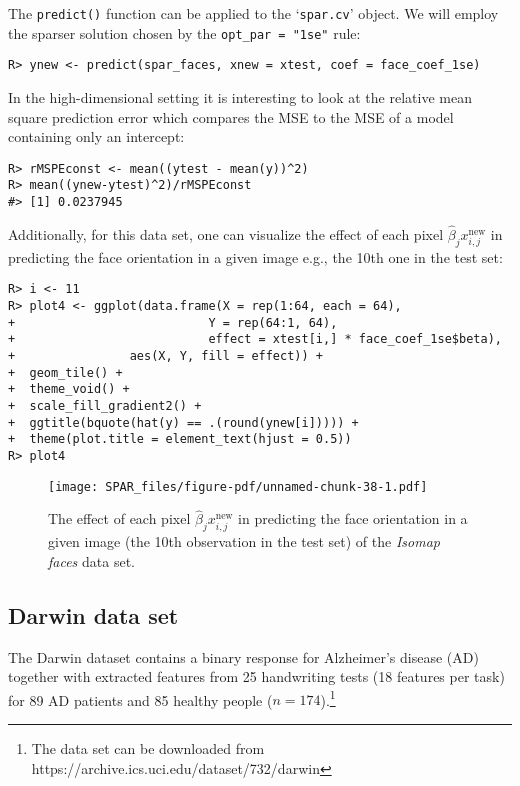 \documentclass[
  article]{jss}
\begin{document}
The \texttt{predict()} function can be applied to the `\texttt{spar.cv}'
object. We will employ the sparser solution chosen by the
\texttt{opt\_par\ =\ "1se"} rule:

\begin{verbatim}
R> ynew <- predict(spar_faces, xnew = xtest, coef = face_coef_1se)
\end{verbatim}

In the high-dimensional setting it is interesting to look at the
relative mean square prediction error which compares the MSE to the MSE
of a model containing only an intercept:

\begin{verbatim}
R> rMSPEconst <- mean((ytest - mean(y))^2) 
R> mean((ynew-ytest)^2)/rMSPEconst
#> [1] 0.0237945
\end{verbatim}

Additionally, for this data set, one can visualize the effect of each
pixel \(\hat\beta_j x^\text{new}_{i,j}\) in predicting the face
orientation in a given image e.g., the 10th one in the test set:

\begin{verbatim}
R> i <- 11
R> plot4 <- ggplot(data.frame(X = rep(1:64, each = 64),
+                           Y = rep(64:1, 64),
+                           effect = xtest[i,] * face_coef_1se$beta), 
+                aes(X, Y, fill = effect)) +
+  geom_tile() +
+  theme_void() +
+  scale_fill_gradient2() +
+  ggtitle(bquote(hat(y) == .(round(ynew[i])))) +
+  theme(plot.title = element_text(hjust = 0.5)) 
R> plot4
\end{verbatim}

\begin{figure}[H]

{\centering \texttt{[image: SPAR\_files/figure-pdf/unnamed-chunk-38-1.pdf]}

}

\caption{The effect of each pixel \(\hat\beta_j x^\text{new}_{i,j}\) in
predicting the face orientation in a given image (the 10th observation
in the test set) of the \emph{Isomap faces} data set.
\label{fig:faces_predictions}}

\end{figure}%

\subsection{Darwin data set}\label{darwin-data-set}

The Darwin dataset \citep{CILIA2022darwin} contains a binary response
for Alzheimer's disease (AD) together with extracted features from 25
handwriting tests (18 features per task) for 89 AD patients and 85
healthy people
(\(n=174\)).\footnote{The data set can be downloaded from  https://archive.ics.uci.edu/dataset/732/darwin}
\end{document}
